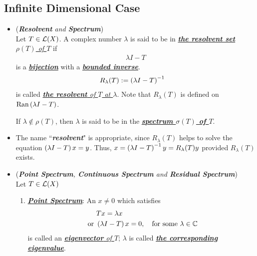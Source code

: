 \documentclass[11pt]{article}
\begin{document}
\subsection{Infinite Dimensional Case}
\begin{itemize}
\item \begin{definition} (\emph{\textbf{Resolvent} and \textbf{Spectrum}})\\
Let $T \in {\mathcal L}(X)$. A complex number $\lambda$ is said to be in \underline{\emph{\textbf{the resolvent set} $\rho(T)$ of $T$}} if  
\begin{align*}
\lambda I - T 
\end{align*} is a \underline{\emph{\textbf{bijection}}} with a \underline{\emph{\textbf{bounded inverse}}}. 
\begin{align*}
R_{\lambda}(T) &:= \left(\lambda I - T \right)^{-1}
\end{align*} is called \underline{\emph{\textbf{the resolvent} of  $T$ at $\lambda$}}. Note that $R_{\lambda}(T)$ is defined on $\text{Ran}\left(\lambda I - T \right)$.

If $\lambda \not\in \rho(T)$, then $\lambda$ is said  to be in the \underline{\emph{\textbf{spectrum $\sigma(T)$ of $T$}}}. 
\end{definition}

\item \begin{remark}
The name ``\emph{\textbf{resolvent}}" is appropriate, since $R_{\lambda}(T)$ helps to solve
the equation $\left(\lambda I - T \right)x = y$. Thus, $x = \left(\lambda I - T  \right)^{-1}y =R_{\lambda}(T)y$ provided $R_{\lambda}(T)$ exists.
\end{remark}

\item \begin{definition} (\emph{\textbf{Point Spectrum}, \textbf{Continuous Spectrum} and \textbf{Residual Spectrum}})\\
Let  $T \in {\mathcal L}(X)$
\begin{enumerate}
\item  \underline{\emph{\textbf{Point Spectrum}}}: An $x \neq 0$ which satisfies 
\begin{align*}
&Tx = \lambda x\\
\text{ or } &\left(\lambda I - T \right)x = 0, \quad \text{for some $\lambda \in {\mathbb C}$}
\end{align*} is called an \underline{\emph{\textbf{eigenvector} of $T$}}; $\lambda$ is called \underline{\emph{\textbf{the corresponding eigenvalue}}}. 


\end{enumerate}
\end{definition}
\end{itemize}
\end{document}

